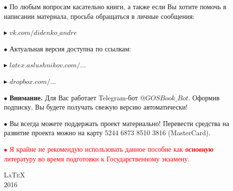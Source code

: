 \begin{flushleft}
$\bullet$ По любым вопросам касательно книги, а также если Вы хотите помочь в написании материала, просьба обращаться в личные сообщения: 

\vspace*{0.2\baselineskip}

\qquad\textcolor{Purplemountainmajesty}{$\blacktriangleright$ }\href{https://vk.com/didenko_andre}{$vk.com/didenko\_andre$}

\vfill

$\bullet$ Актуальная версия доступна по ссылкам:

\vspace*{0.2\baselineskip}

\qquad\textcolor{Purplemountainmajesty}{$\blacktriangleright$ }\href{http://latex.aslushnikov.com/compile?git=https://github.com/DidenkoAndre/GOS_book&target=_main.tex}{\large \textcolor{Purplemountainmajesty}{$latex.aslushnikov.com/...$}}

\vspace*{0.2\baselineskip}

\qquad\textcolor{Purplemountainmajesty}{$\blacktriangleright$ }\href{https://www.dropbox.com/sh/7e5mfj8q68o2ipp/AAD8XvpZhiJzFbEh_IeH305ia?dl=0&preview=GOSBook.pdf}{\large \textcolor{Purplemountainmajesty}{$dropbox.com/...$}}

\vfill

$\bullet$ \textbf{Внимание.} Для Вас работает Telegram-бот \href{https://t.me/GOSBook_Bot}{\textcolor{PersianBlue}{$@GOSBook\_Bot$}}. Оформив подписку\footnotemark{}, Вы будете получать свежую версию автоматически!


\vfill

$\bullet$ Вы всегда можете поддержать проект материально! 
Перевести средства на развитие проекта можно на карту {\large 5244 6873 8510 3816} \textsf{(MasterCard)}.

\bigskip
\vfill

\bigskip
\vfill

\textcolor{red}{
$\bullet$ Я крайне не рекомендую использовать данное пособие как \textit{\textbf{основную}} литературу во время подготовки к Государственному экзамену.
}
\end{flushleft}

\vfill
{\LARGE\scshape \LaTeX}\\[0.5\baselineskip]
{\LARGE\scshape 2016}\par
\restoregeometry
\endgroup
\newpage